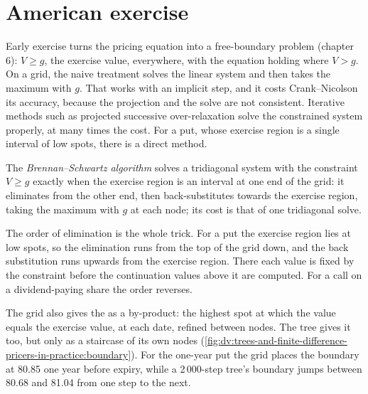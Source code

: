 \section{American exercise}

Early exercise turns the pricing equation into a free-boundary problem (chapter 6): $V\ge g$, the exercise value, everywhere, with the
equation holding where $V>g$. On a grid, the naive treatment solves the linear system and then takes the maximum with $g$. That works with an
implicit step, and it costs Crank--Nicolson its accuracy, because the projection and the solve are not consistent. Iterative methods such as
projected successive over-relaxation solve the constrained system properly, at many times the cost. For a put, whose exercise region is a
single interval of low spots, there is a direct method.

\begin{definition}\label{def:dv:trees-and-finite-difference-pricers-in-practice:bs}
The \emph{Brennan--Schwartz algorithm} solves a tridiagonal system with the constraint $V\ge g$ exactly
when the exercise region is an interval at one end of the grid: it eliminates from the other end, then back-substitutes towards the exercise
region, taking the maximum with $g$ at each node; its cost is that of one tridiagonal solve.
\end{definition}

The order of elimination is the whole trick. For a put the exercise region lies at low spots, so the elimination runs from the top of the grid
down, and the back substitution runs upwards from the exercise region. There each value is fixed by the constraint before the continuation
values above it are computed. For a call on a dividend-paying share the order reverses.

The grid also gives the  as a by-product: the highest spot at which the value equals the exercise value, at each date,
refined between nodes. The tree gives it too, but only as a staircase of its own nodes
(\cref{fig:dv:trees-and-finite-difference-pricers-in-practice:boundary}). For the one-year put the grid places the boundary at 80.85 one year
before expiry, while a 2\,000-step tree's boundary jumps between 80.68 and 81.04 from one step to the next.

